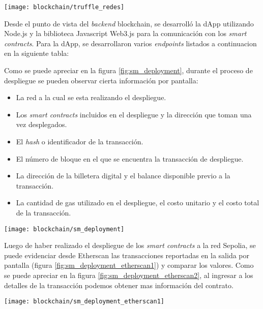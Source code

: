 \begin{center}
   \texttt{[image: blockchain/truffle\_redes]}
   \label{fig:truffle_redes}
\end{center}


Desde el punto de vista del \textit{backend} blockchain, se desarrolló la dApp utilizando Node.js y la biblioteca Javascript Web3.js para la comunicación con los \textit{smart contracts}. Para la dApp, se desarrollaron varios \textit{endpoints} listados a continuacion en la siguiente tabla:



Como se puede apreciar en la figura \ref{fig:sm_deployment}, durante el proceso de despliegue se pueden observar cierta información por pantalla:

\begin{itemize}
	\item La red a la cual se esta realizando el despliegue.
	\item Los \textit{smart contracts} incluidos en el despliegue y la dirección que toman una vez desplegados. 
	\item El \textit{hash} o identificador de la transacción.
	\item El número de bloque en el que se encuentra la transacción de despliegue.
	\item La dirección de la billetera digital y el balance disponible previo a la transacción.
	\item La cantidad de gas utilizado en el despliegue, el costo unitario y el costo total de la transacción.
\end{itemize}

\begin{center}
   \texttt{[image: blockchain/sm\_deployment]}
   \label{fig:sm_deployment}
\end{center}

Luego de haber realizado el despliegue de los \textit{smart contracts} a la red Sepolia, se puede evidenciar desde Etherscan las transacciones reportadas en la salida por pantalla (figura \ref{fig:sm_deployment_etherscan1}) y comparar los valores. Como se puede apreciar en la figura \ref{fig:sm_deployment_etherscan2}, al ingresar a los detalles de la transacción podemos obtener mas información del contrato.

\begin{center}
   \texttt{[image: blockchain/sm\_deployment\_etherscan1]}
   \label{fig:sm_deployment_etherscan1}
\end{center}


